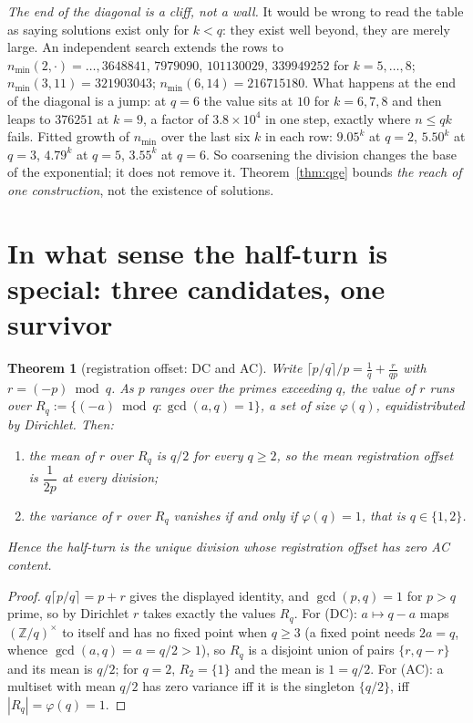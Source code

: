 \documentclass[11pt]{article}
\newtheorem{theorem}{Theorem}
\begin{document}
\emph{The end of the diagonal is a cliff, not a wall.}  It would be wrong to read the table as
saying solutions exist only for $k<q$: they exist well beyond, they are merely large.  An
independent search extends the rows to
$n_{\min}(2,\cdot)=\dots,3648841,\,7979090,\,101130029,\,339949252$ for $k=5,\dots,8$;
$n_{\min}(3,11)=321903043$; $n_{\min}(6,14)=216715180$.  What happens at the end of the
diagonal is a jump: at $q=6$ the value sits at $10$ for $k=6,7,8$ and then leaps to $376251$
at $k=9$, a factor of $3.8\times10^{4}$ in one step, exactly where $n\le qk$ fails.  Fitted
growth of $n_{\min}$ over the last six $k$ in each row: $9.05^{k}$ at $q=2$, $5.50^{k}$ at
$q=3$, $4.79^{k}$ at $q=5$, $3.55^{k}$ at $q=6$.  So coarsening the division changes the base
of the exponential; it does not remove it.  Theorem~\ref{thm:qge} bounds \emph{the reach of
one construction}, not the existence of solutions.

\section{In what sense the half-turn is special: three candidates, one survivor}

\begin{theorem}[registration offset: DC and AC]\label{thm:phi}
Write $\lceil p/q\rceil/p=\frac1q+\frac{r}{qp}$ with $r=(-p)\bmod q$.  As $p$ ranges over the
primes exceeding $q$, the value of $r$ runs over $R_q:=\{(-a)\bmod q:\gcd(a,q)=1\}$, a set of
size $\varphi(q)$, equidistributed by Dirichlet.  Then:
\begin{enumerate}
\item[\rm(DC)] the mean of $r$ over $R_q$ is $q/2$ for \emph{every} $q\ge2$, so the mean
      registration offset is $\dfrac1{2p}$ at every division;
\item[\rm(AC)] the variance of $r$ over $R_q$ vanishes if and only if $\varphi(q)=1$, that is
      $q\in\{1,2\}$.
\end{enumerate}
Hence the half-turn is the unique division whose registration offset has \emph{zero AC
content}.
\end{theorem}

\begin{proof}
$q\lceil p/q\rceil=p+r$ gives the displayed identity, and $\gcd(p,q)=1$ for $p>q$ prime, so by
Dirichlet $r$ takes exactly the values $R_q$.  For (DC): $a\mapsto q-a$ maps
$(\mathbb Z/q)^{\times}$ to itself and has no fixed point when $q\ge3$ (a fixed point needs
$2a=q$, whence $\gcd(a,q)=a=q/2>1$), so $R_q$ is a disjoint union of pairs $\{r,q-r\}$ and its
mean is $q/2$; for $q=2$, $R_2=\{1\}$ and the mean is $1=q/2$.  For (AC): a multiset with mean
$q/2$ has zero variance iff it is the singleton $\{q/2\}$, iff $|R_q|=\varphi(q)=1$.
\end{proof}
\end{document}
